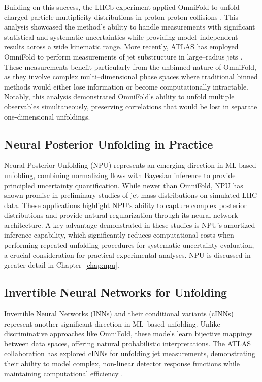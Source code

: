     Building on this success, the LHCb experiment applied OmniFold to unfold charged particle multiplicity distributions in proton-proton collisions .
    This analysis showcased the method's ability to handle measurements with significant statistical and systematic uncertainties while providing model--independent results across a wide kinematic range.
    More recently, ATLAS has employed OmniFold to perform measurements of jet substructure in large--radius jets .
    These measurements benefit particularly from the unbinned nature of OmniFold, as they involve complex multi--dimensional phase spaces where traditional binned methods would either lose information or become computationally intractable. 
    Notably, this analysis demonstrated OmniFold's ability to unfold multiple observables simultaneously, preserving correlations that would be lost in separate one-dimensional unfoldings.

\subsection{Neural Posterior Unfolding in Practice}
    Neural Posterior Unfolding (NPU) represents an emerging direction in ML-based unfolding, combining normalizing flows with Bayesian inference to provide principled uncertainty quantification.
    While newer than OmniFold, NPU has shown promise in preliminary studies of jet mass distributions on simulated LHC data. 
    These applications highlight NPU's ability to capture complex posterior distributions and provide natural regularization through its neural network architecture.
    A key advantage demonstrated in these studies is NPU's amortized inference capability, which significantly reduces computational costs when performing repeated unfolding procedures for systematic uncertainty evaluation, a crucial consideration for practical experimental analyses.
    NPU is discussed in greater detail in Chapter~\ref{chap:npu}.
    
\subsection{Invertible Neural Networks for Unfolding}
    Invertible Neural Networks (INNs) and their conditional variants (cINNs) represent another significant direction in ML--based unfolding.
    Unlike discriminative approaches like OmniFold, these models learn bijective mappings between data spaces, offering natural probabilistic interpretations.
    The ATLAS collaboration has explored cINNs for unfolding jet measurements, demonstrating their ability to model complex, non-linear detector response functions while maintaining computational efficiency .

